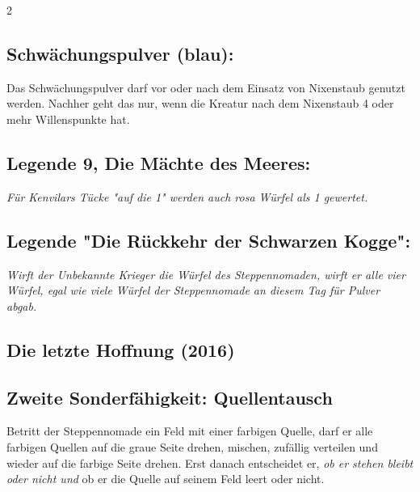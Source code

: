 \documentclass[10pt, a4paper, oneside]{book}
\newcommand{\fan}[1]{\textit{#1}}
\begin{document}
\begin{multicols*}{2}
\begin{bgcolor}
\subsection{Schwächungspulver (blau):}

Das Schwächungspulver darf vor oder nach dem Einsatz von Nixenstaub genutzt werden. Nachher geht das nur, wenn die Kreatur nach dem Nixenstaub 4 oder mehr Willenspunkte hat.
\supercite{MH:Begleitheft,88552}




\subsection{Legende 9, Die Mächte des Meeres:}

\fan{Für Kenvilars Tücke "auf die 1" werden auch rosa Würfel als 1 gewertet.}
\supercite{15179}


\subsection{Legende "Die Rückkehr der Schwarzen Kogge":}

\fan{Wirft der Unbekannte Krieger die Würfel des Steppennomaden, wirft er alle vier Würfel, egal wie viele Würfel der Steppennomade an diesem Tag für Pulver abgab.}

\end{bgcolor}



\columnbreak


\begin{bgcolor}
\section{Die letzte Hoffnung (2016)}




\subsection{Zweite Sonderfähigkeit: Quellentausch}

Betritt der Steppennomade ein Feld mit einer farbigen Quelle, darf er alle farbigen Quellen auf die graue Seite drehen, mischen, zufällig verteilen und wieder auf die farbige Seite drehen. Erst danach entscheidet er, \fan{ob er stehen bleibt oder nicht und} ob er die Quelle auf seinem Feld leert oder nicht.
\supercite{MH11:Heldenkarte_Steppennomade,94521}




\end{bgcolor}
\end{multicols*}
\end{document}
